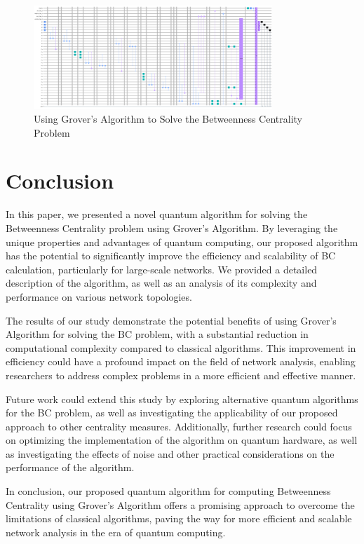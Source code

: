 \begin{figure}[htp]
    \centering
    \includegraphics[width=9cm]{Figures/Betweenness_Centrality_circuit.png}
    \caption{Using Grover's Algorithm to Solve the Betweenness Centrality Problem}
    \label{fig:Betweenness_Centrality}
\end{figure}

\section{Conclusion}\label{sec:conclusion}

In this paper, we presented a novel quantum algorithm for solving the Betweenness Centrality problem using Grover's Algorithm. By leveraging the unique properties and advantages of quantum computing, our proposed algorithm has the potential to significantly improve the efficiency and scalability of BC calculation, particularly for large-scale networks. We provided a detailed description of the algorithm, as well as an analysis of its complexity and performance on various network topologies.

The results of our study demonstrate the potential benefits of using Grover's Algorithm for solving the BC problem, with a substantial reduction in computational complexity compared to classical algorithms. This improvement in efficiency could have a profound impact on the field of network analysis, enabling researchers to address complex problems in a more efficient and effective manner.

Future work could extend this study by exploring alternative quantum algorithms for the BC problem, as well as investigating the applicability of our proposed approach to other centrality measures. Additionally, further research could focus on optimizing the implementation of the algorithm on quantum hardware, as well as investigating the effects of noise and other practical considerations on the performance of the algorithm.

In conclusion, our proposed quantum algorithm for computing Betweenness Centrality using Grover's Algorithm offers a promising approach to overcome the limitations of classical algorithms, paving the way for more efficient and scalable network analysis in the era of quantum computing.

